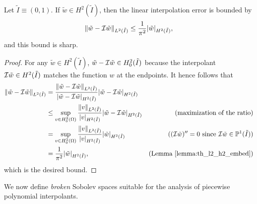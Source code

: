 \begin{proposition}
  \label{prop:th_lin_interp_L2_ref}
  Let $\tilde I \equiv (0,1)$.  If $\tilde w \in H^2(\tilde I)$, then the linear interpolation error is bounded by 
  \begin{equation*}
    \| \tilde w - \mathcal{I} \tilde w \|_{L^2(\tilde I)}
    \leq \frac{1}{\pi^2} | \tilde w |_{H^2(\tilde I)},
  \end{equation*}
  and this bound is sharp.
  \begin{proof}
    For any $\tilde w \in H^2(\tilde I)$, $\tilde w - \mathcal{I} \tilde w \in H^2_0(\tilde I)$ because the interpolant $\mathcal{I} \tilde w \in H^2(\tilde I)$ matches the function $w$ at the endpoints. It hence follows that
    \begin{align*}
      \| \tilde w - \mathcal{I} \tilde w \|_{L^2(\tilde I)}
      &=
      \frac{\| \tilde w - \mathcal{I} \tilde w \|_{L^2(\tilde I)}}{| \tilde w - \mathcal{I} \tilde w |_{H^2(\tilde I)}} | \tilde w - \mathcal{I} \tilde w |_{H^2(\tilde I)}
      \\
      &\leq \sup_{v \in H^2_0(\Omega)} \frac{\| v \|_{L^2(\tilde I)}}{| v |_{H^2(\tilde I)}} | \tilde w - \mathcal{I} \tilde w |_{H^2(\tilde I)}
      & \text{(maximization of the ratio)}\\
      &= \sup_{v \in H^2_0(\Omega)} \frac{\| v \|_{L^2(\tilde I)}}{| v |_{H^2(\tilde I)}} | \tilde w |_{H^2(\tilde I)}
      & \text{($(\mathcal{I} \tilde w)'' = 0$ since $\mathcal{I} \tilde w \in \mathbb{P}^1(\tilde I)$)} \\
      &= \frac{1}{\pi^2} | \tilde w |_{H^2(\tilde I)},
      & \text{(Lemma~\ref{lemma:th_l2_h2_embed})}
    \end{align*}
    which is the desired bound.
  \end{proof}
\end{proposition}
We now define \emph{broken} Sobolev spaces suitable for the analysis of piecewise polynomial interpolants.
